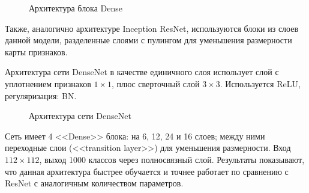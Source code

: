 \documentclass[12pt, specialist, subf, substylefile = spbu.rtx]{disser}
\begin{document}
\begin{figure}[h]
\caption{Архитектура блока Dense}
\label{img:densenet0}
\end{figure}

Также, аналогично архитектуре Inception ResNet, используются блоки из слоев данной модели, разделенные слоями с пулингом для уменьшения размерности карты признаков. 

Архитектура сети DenseNet в качестве единичного слоя использует слой с уплотнением признаков $1 \times 1$, плюс сверточный слой $3 \times 3$. Используется ReLU, регуляризация: BN. 

\begin{figure}[h]
\caption{Архитектура сети DenseNet}
\label{img:densenet1}
\end{figure}

Сеть имеет 4 <<Dense>> блока: на 6, 12, 24 и 16 слоев; между ними переходные слои (<<transition layer>>) для уменьшения размерности. Вход $112 \times 112$, выход 1000 классов через полносвязный слой. Результаты показывают, что данная архитектура быстрее обучается и точнее работает по сравнению с ResNet с аналогичным количеством параметров.
\end{document}
